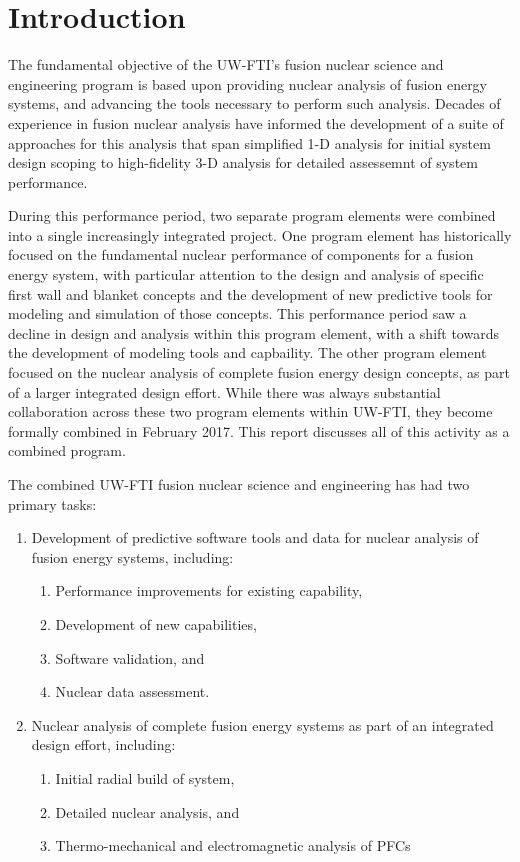 \section{Introduction}

The fundamental objective of the \gls{UW-FTI}'s fusion nuclear science and
engineering program is based upon providing nuclear analysis of fusion energy
systems, and advancing the tools necessary to perform such analysis.  Decades
of experience in fusion nuclear analysis have informed the development of a
suite of approaches for this analysis that span simplified 1-D analysis for
initial system design scoping to high-fidelity 3-D analysis for detailed
assessemnt of system performance.

During this performance period, two separate program elements were combined
into a single increasingly integrated project.  One program element has
historically focused on the fundamental nuclear performance of components for
a fusion energy system, with particular attention to the design and analysis
of specific first wall and blanket concepts and the development of new
predictive tools for modeling and simulation of those concepts.  This
performance period saw a decline in design and analysis within this program
element, with a shift towards the development of modeling tools and
capbaility.  The other program element focused on the nuclear analysis of
complete fusion energy design concepts, as part of a larger integrated design
effort.  While there was always substantial collaboration across these two
program elements within \gls{UW-FTI}, they become formally combined in
February 2017.  This report discusses all of this activity as a combined
program.

The combined \gls{UW-FTI} fusion nuclear science and engineering has had two
primary tasks:
\begin{enumerate}
\item Development of predictive software tools and data for nuclear analysis
  of fusion energy systems, including:
  \begin{enumerate}
  \item Performance improvements for existing capability,
  \item Development of new capabilities,
  \item Software validation, and
  \item Nuclear data assessment.
  \end{enumerate}
\item Nuclear analysis of complete fusion energy systems as part of an
  integrated design effort, including:
  \begin{enumerate}
  \item Initial radial build of system,
  \item Detailed nuclear analysis, and
  \item Thermo-mechanical and electromagnetic analysis of \glspl{PFC}
  \end{enumerate}
\end{enumerate}

